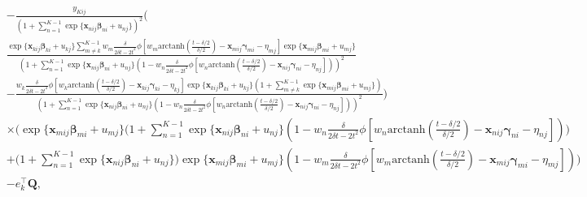 \documentclass[12pt, %
               openright, %
               oneside, %
               a4paper, %
               chapter=TITLE, %
               section=TITLE, %
               brazil,
               english %
]{abntex2}
\begin{document}
\begin{apendicesenv}
\begin{align*}
 &- \frac{y_{Kij}}{
    \left( 1 + \sum_{n = 1}^{K-1}
               \exp\{\bm{x}_{nij} \bm{\beta}_{ni} + u_{nj}\}
    \right)^{2}} \Bigg(\\
 & \frac{\exp\{\bm{x}_{kij} \bm{\beta}_{ki} + u_{kj}\}
         \sum_{m \neq k}^{K-1}
         w_{m}\frac{\delta}{2\delta t - 2t^{2}}
         \phi[w_{m}\text{arctanh}
                   \left(\frac{t-\delta/2}{\delta/2}\right)
              - \bm{x}_{mij}\bm{\gamma}_{mi} - \eta_{mj}
             ]
         \exp\{\bm{x}_{mij} \bm{\beta}_{mi} + u_{mj}\}}{
   \left( 1 + \sum_{n = 1}^{K-1}
              \exp\{\bm{x}_{nij} \bm{\beta}_{ni} + u_{nj}\}
          (1 - w_{n}\frac{\delta}{2\delta t - 2t^{2}}
               \phi[w_{n}
               \text{arctanh}\left(\frac{t-\delta/2}{\delta/2}\right)
               - \bm{x}_{nij}\bm{\gamma}_{ni} - \eta_{nj}])
   \right)^{2}}\\
 &- \frac{w_{k}\frac{\delta}{2\delta t - 2t^{2}}
          \phi[w_{k}
               \text{arctanh}\left(\frac{t-\delta/2}{\delta/2}\right)
               - \bm{x}_{kij}\bm{\gamma}_{ki} - \eta_{kj}
              ]
          \exp\{\bm{x}_{kij} \bm{\beta}_{ki} + u_{kj}\}
          \left( 1 + \sum_{m \neq k}^{K-1}
                     \exp\{\bm{x}_{mij} \bm{\beta}_{mi} + u_{mj}\}
          \right)}{
    \left( 1 + \sum_{n = 1}^{K-1}
               \exp\{\bm{x}_{nij} \bm{\beta}_{ni} + u_{nj}\}
           (1 - w_{n}\frac{\delta}{2\delta t - 2t^{2}}
                \phi[w_{n}
                \text{arctanh}\left(\frac{t-\delta/2}{\delta/2}\right)
                     - \bm{x}_{nij}\bm{\gamma}_{ni} - \eta_{nj}])
    \right)^{2}} \Bigg)\\
 &\times \Bigg(
 \exp\{\bm{x}_{mij} \bm{\beta}_{mi} + u_{mj}\}
 \Big( 1 + \sum_{n = 1}^{K-1}
           \exp\{\bm{x}_{nij} \bm{\beta}_{ni} + u_{nj}\}
       (1 - w_{n}\frac{\delta}{2\delta t - 2t^{2}}
            \phi[w_{n}
                 \text{arctanh}\left(\frac{t-\delta/2}{\delta/2}\right)
                 - \bm{x}_{nij}\bm{\gamma}_{ni} - \eta_{nj}])
 \Big)\\
 &+ \Big( 1 + \sum_{n = 1}^{K-1}
              \exp\{\bm{x}_{nij} \bm{\beta}_{ni} + u_{nj}\}
    \Big) \exp\{\bm{x}_{mij} \bm{\beta}_{mi} + u_{mj}\}
    (1 - w_{m}\frac{\delta}{2\delta t - 2t^{2}}
        \phi[w_{m}
             \text{arctanh}\left(\frac{t-\delta/2}{\delta/2}\right)
             - \bm{x}_{mij}\bm{\gamma}_{mi} - \eta_{mj}]) \Bigg)\\
 &- e_{k}^{\top} \bm{Q},\\
\end{align*}
\begin{align*}

\end{align*}
\end{apendicesenv}
\end{document}
